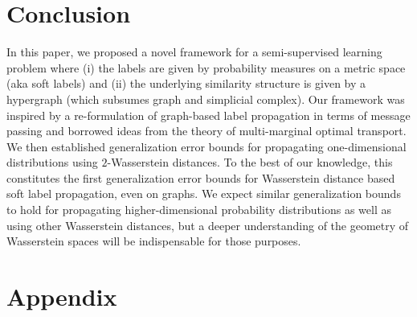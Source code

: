 \documentclass[letterpaper]{article} %
\begin{document}

\section{Conclusion}
In this paper, we proposed a novel framework for a semi-supervised learning problem where (i) the labels are given by probability measures on a metric space (aka soft labels) and (ii) the underlying similarity structure is given by a hypergraph (which subsumes graph and simplicial complex). Our framework was inspired by a re-formulation of graph-based label propagation in terms of message passing and borrowed ideas from the theory of multi-marginal optimal transport. We then established generalization error bounds for propagating one-dimensional distributions using $2$-Wasserstein distances. To the best of our knowledge, this constitutes the first generalization error bounds for Wasserstein distance based soft label propagation, even on graphs. We expect similar generalization bounds to hold for propagating higher-dimensional probability distributions as well as using other Wasserstein distances, but a deeper understanding of the geometry of Wasserstein spaces will be indispensable for those purposes.
	
	

	




	\clearpage
	\section{Appendix}
	
\end{document}
